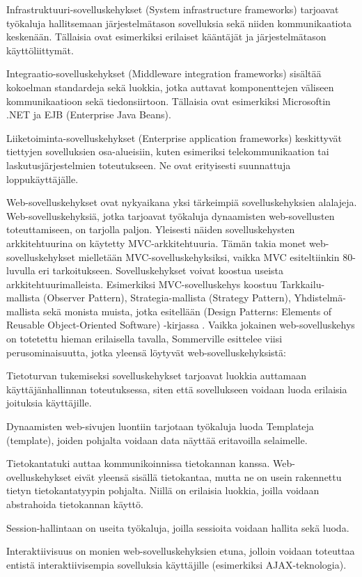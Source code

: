 \documentclass[utf8]{gradu3}
\begin{document}
\begin{desclist}
\item[Infrastruktuuri-sovelluskehykset (System infrastructure frameworks)] tarjoavat työkaluja hallitsemaan järjestelmätason sovelluksia sekä niiden kommunikaatiota keskenään. Tällaisia ovat esimerkiksi erilaiset kääntäjät ja järjestelmätason käyttöliittymät. 
\item[Integraatio-sovelluskehykset (Middleware integration frameworks)] sisältää kokoelman standardeja sekä luokkia, jotka auttavat komponenttejen väliseen kommunikaatioon sekä tiedonsiirtoon. Tällaisia ovat esimerkiksi Microsoftin .NET ja EJB (Enterprise Java Beans). 
\item[Liiketoiminta-sovelluskehykset (Enterprise application frameworks)] keskittyvät tiettyjen sovelluksien osa-alueisiin, kuten esimeriksi telekommunikaation tai laskutusjärjestelmien toteutukseen. Ne ovat erityisesti suunnattuja loppukäyttäjälle.

\end{desclist}
Web-sovelluskehykset ovat nykyaikana yksi tärkeimpiä sovelluskehyksien alalajeja. Web-sovelluskehyksiä, jotka tarjoavat työkaluja dynaamisten web-sovellusten toteuttamiseen, on tarjolla paljon. Yleisesti näiden sovelluskehysten arkkitehtuurina on käytetty MVC-arkkitehtuuria. Tämän takia monet web-sovelluskehykset mielletään MVC-sovelluskehyksiksi, vaikka MVC esiteltiinkin 80-luvulla eri tarkoitukseen. Sovelluskehykset voivat koostua useista arkkitehtuurimalleista. Esimerkiksi MVC-sovelluskehys koostuu Tarkkailu-mallista (Observer Pattern), Strategia-mallista (Strategy Pattern), Yhdistelmä-mallista sekä monista muista, jotka esitellään (Design Patterns: Elements of Reusable Object-Oriented Software) -kirjassa \parencite{design_patterns}. Vaikka jokainen web-sovelluskehys on totetettu hieman erilaisella tavalla, Sommerville esittelee viisi perusominaisuutta, jotka yleensä löytyvät web-sovelluskehyksistä:

\begin{desclist}
\item[Tietoturvan] tukemiseksi sovelluskehykset tarjoavat luokkia auttamaan käyttäjänhallinnan toteutuksessa, siten että sovellukseen voidaan luoda erilaisia joituksia käyttäjille. 
\item[Dynaamisten web-sivujen] luontiin tarjotaan työkaluja luoda Templateja (template), joiden pohjalta voidaan data näyttää eritavoilla selaimelle.
\item[Tietokantatuki] auttaa kommunikoinnissa tietokannan kanssa. Web-ovelluskehykset eivät yleensä sisällä tietokantaa, mutta ne on usein rakennettu tietyn tietokantatyypin pohjalta. Niillä on erilaisia luokkia, joilla voidaan abstrahoida tietokannan käyttö.
\item[Session-hallintaan] on useita työkaluja, joilla sessioita voidaan hallita sekä luoda.
\item[Interaktiivisuus] on monien web-sovelluskehyksien etuna, jolloin voidaan toteuttaa entistä interaktiivisempia sovelluksia käyttäjille (esimerkiksi AJAX-teknologia).
\end{desclist}
\end{document}
